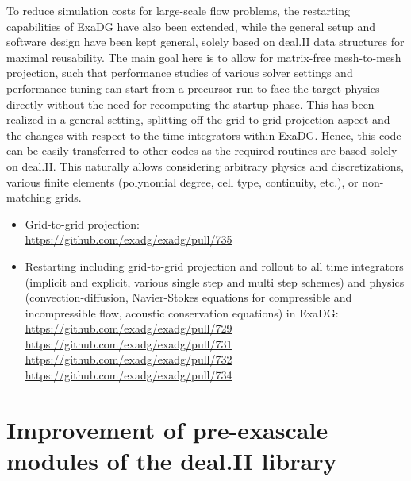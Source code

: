 \documentclass[a4paper,12pt]{article}
\begin{document}
To reduce simulation costs for large-scale flow problems, the restarting capabilities of ExaDG have also been extended, while the general setup and software design have been kept general, solely based on deal.II data structures for maximal reusability. The main goal here is to allow for matrix-free mesh-to-mesh projection, such that performance studies of various solver settings and performance tuning can start from a precursor run to face the target physics directly without the need for recomputing the startup phase. This has been realized in a general setting, splitting off the grid-to-grid projection aspect and the changes with respect to the time integrators within ExaDG. Hence, this code can be easily transferred to other codes as the required routines are based solely on deal.II. This naturally allows considering arbitrary physics and discretizations, various finite elements (polynomial degree, cell type, continuity, etc.), or non-matching grids.
    \begin{itemize}
        \item Grid-to-grid projection:\\
        \href{https://github.com/exadg/exadg/pull/735}{https://github.com/exadg/exadg/pull/735}    
        \item Restarting including grid-to-grid projection and rollout to all time integrators (implicit and explicit, various single step and multi step schemes) and physics (convection-diffusion, Navier-Stokes equations for compressible and incompressible flow, acoustic conservation equations) in ExaDG:\\
        \href{https://github.com/exadg/exadg/pull/729}{https://github.com/exadg/exadg/pull/729}\\
        \href{https://github.com/exadg/exadg/pull/731}{https://github.com/exadg/exadg/pull/731}\\
        \href{https://github.com/exadg/exadg/pull/732}{https://github.com/exadg/exadg/pull/732}\\
        \href{https://github.com/exadg/exadg/pull/734}{https://github.com/exadg/exadg/pull/734}     
    \end{itemize}

\section{Improvement of pre-exascale modules of the deal.II library}
\end{document}
